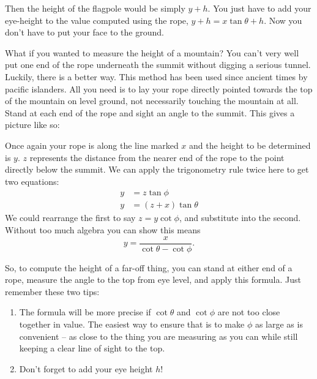 \documentclass{article}
\begin{document}
Then the height of the flagpole would be simply $y+h$. You just have to add your eye-height to the value computed using the rope, $y+h=x\tan\theta+h$. Now you don't have to put your face to the ground.

What if you wanted to measure the height of a mountain? You can't very well put one end of the rope underneath the summit without digging a serious tunnel. Luckily, there is a better way. This method has been used since ancient times by pacific islanders. All you need is to lay your rope directly pointed towards the top of the mountain on level ground, not necessarily touching the mountain at all. Stand at each end of the rope and sight an angle to the summit. This gives a picture like so:

\begin{figure}[h!]
\centering
{}
\end{figure}

Once again your rope is along the line marked $x$ and the height to be determined is $y$. $z$ represents the distance from the nearer end of the rope to the point directly below the summit. We can apply the trigonometry rule twice here to get two equations:
\begin{align*}
y &= z \tan \phi\\
y &= (z+x) \tan \theta
\end{align*}
We could rearrange the first to say $z = y \cot \phi$, and substitute into the second. Without too much algebra you can show this means
\[
y = \frac{x}{\cot \theta -\cot \phi}.
\]

So, to compute the height of a far-off thing, you can stand at either end of a rope, measure the angle to the top from eye level, and apply this formula. Just remember these two tips:

\begin{enumerate}
\item The formula will be more precise if $\cot\theta$ and $\cot \phi$ are not too close together in value. The easiest way to ensure that is to make $\phi$ as large as is convenient -- as close to the thing you are measuring as you can while still keeping a clear line of sight to the top.
\item Don't forget to add your eye height $h$!
\end{enumerate}
\end{document}
